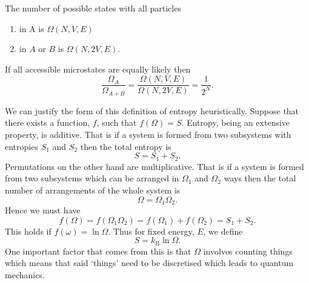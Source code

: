 \documentclass[a4paper]{article}
\newcommand{\boltzmann}{k_\mathrm{B}}
\begin{document}
    The number of possible states with all particles
    \begin{enumerate}
        \item in A is \(\Omega(N, V, E)\)
        \item in \(A\) or \(B\) is \(\Omega(N, 2V, E)\).
    \end{enumerate}
    If all accessible microstates are equally likely then
    \[\frac{\Omega_A}{\Omega_{A+B}} = \frac{\Omega(N, V, E)}{\Omega(N, 2V, E)} = \frac{1}{2^N}.\]
    
    We can justify the form of this definition of entropy heuristically.
    Suppose that there exists a function, \(f\), such that \(f(\Omega) = S\).
    Entropy, being an extensive property, is additive.
    That is if a system is formed from two subsystems with entropies \(S_1\) and \(S_2\) then the total entropy is
    \[S = S_1 + S_2.\]
    Permutations on the other hand are multiplicative.
    That is if a system is formed from two subsystems which can be arranged in \(\Omega_1\) and \(\Omega_2\) ways then the total number of arrangements of the whole system is
    \[\Omega = \Omega_1\Omega_2.\]
    Hence we must have
    \[f(\Omega) = f(\Omega_1\Omega_2) = f(\Omega_1) + f(\Omega_2) = S_1 + S_2.\]
    This holds if \(f(\omega) = \ln\Omega\).
    Thus for fixed energy, \(E\), we define
    \[S = \boltzmann\ln\Omega.\]
    One important factor that comes from this is that \(\Omega\) involves counting things which means that said `things' need to be discretised which leads to quantum mechanics.
    
\end{document}

